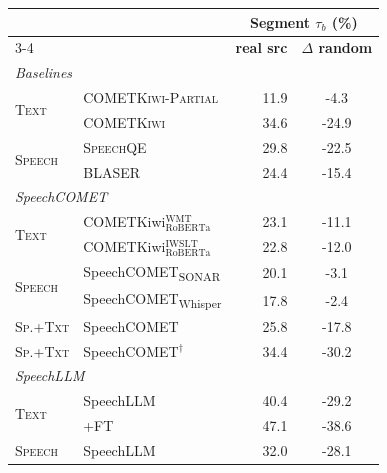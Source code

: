 \begin{table}[t]
\centering
\footnotesize
\setlength{\tabcolsep}{4pt}
\begin{tabular}{ll|rc}
\toprule
 & & \multicolumn{2}{c}{\textbf{Segment $\tau_b$ (\%)}} \\
\cmidrule(lr){3-4}
 & & \textbf{real src} & \textbf{$\Delta$ random} \\
\midrule
\multicolumn{4}{l}{\textit{Baselines}} \\
\midrule
\multirow{2}{*}{\textsc{Text}} & \textsc{COMETKiwi-Partial} & \cellcolor[RGB]{255,255,255}11.9 & \cellcolor[RGB]{249,251,253}-4.3 \\
 & \textsc{COMETKiwi} & \cellcolor[RGB]{212,236,236}34.6 & \cellcolor[RGB]{194,215,235}-24.9 \\
\multirow{2}{*}{\textsc{Speech}} & \textsc{SpeechQE} & \cellcolor[RGB]{221,240,240}29.8 & \cellcolor[RGB]{201,219,237}-22.5 \\
 & \textsc{BLASER} & \cellcolor[RGB]{231,244,244}24.4 & \cellcolor[RGB]{220,232,243}-15.4 \\
\midrule
\multicolumn{4}{l}{\textit{SpeechCOMET}} \\
\midrule
\multirow{2}{*}{\textsc{Text}} & COMETKiwi$_{\text{RoBERTa}}^{\text{WMT}}$ & \cellcolor[RGB]{234,246,245}23.1 & \cellcolor[RGB]{231,239,247}-11.1 \\
 & COMETKiwi$_{\text{RoBERTa}}^{\text{IWSLT}}$ & \cellcolor[RGB]{234,246,246}22.8 & \cellcolor[RGB]{229,238,246}-12.0 \\
\multirow{2}{*}{\textsc{Speech}} & SpeechCOMET\textsubscript{SONAR} & \cellcolor[RGB]{239,248,248}20.1 & \cellcolor[RGB]{253,253,254}-3.1 \\
 & SpeechCOMET\textsubscript{Whisper} & \cellcolor[RGB]{244,250,250}17.8 & \cellcolor[RGB]{255,255,255}-2.4 \\
\textsc{Sp.+Txt} & SpeechCOMET & \cellcolor[RGB]{228,243,243}25.8 & \cellcolor[RGB]{213,228,241}-17.8 \\
\textsc{Sp.+Txt} & SpeechCOMET$^\dagger$ & \cellcolor[RGB]{212,236,236}34.4 & \cellcolor[RGB]{180,206,231}-30.2 \\
\midrule
\multicolumn{4}{l}{\textit{SpeechLLM}} \\
\midrule
\multirow{2}{*}{\textsc{Text}} & SpeechLLM & \cellcolor[RGB]{201,232,231}40.4 & \cellcolor[RGB]{183,208,232}-29.2 \\
 & \quad+FT & \cellcolor[RGB]{188,226,226}47.1 & \cellcolor[RGB]{157,191,223}-38.6 \\
\multirow{2}{*}{\textsc{Speech}} & SpeechLLM & \cellcolor[RGB]{217,238,238}32.0 & \cellcolor[RGB]{186,209,232}-28.1 \\

\end{tabular}
\end{table}

